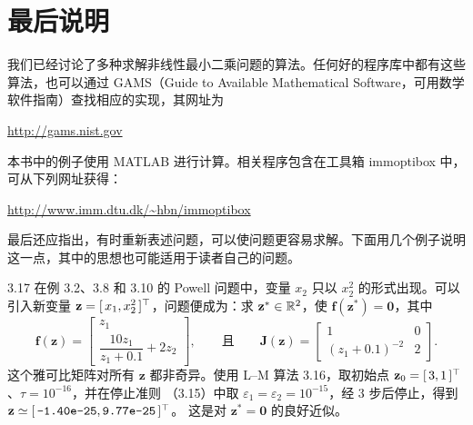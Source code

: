 \section{最后说明}\label{sec:final-remarks}
我们已经讨论了多种求解非线性最小二乘问题的算法。任何好的程序库中都有这些算法，也可以通过 GAMS（Guide to Available Mathematical Software，可用数学软件指南）查找相应的实现，其网址为
\begin{center}
  \url{http://gams.nist.gov}
\end{center}
本书中的例子使用 MATLAB 进行计算。相关程序包含在工具箱 immoptibox 中，可从下列网址获得：
\begin{center}
  \url{http://www.imm.dtu.dk/~hbn/immoptibox}
\end{center}
最后还应指出，有时重新表述问题，可以使问题更容易求解。下面用几个例子说明这一点，其中的思想也可能适用于读者自己的问题。

\begin{example}{3.17}
在例 3.2、3.8 和 3.10 的 Powell 问题中，变量 $x_2$ 只以 $x_2^2$ 的形式出现。可以引入新变量 $\mathbf z=[\,x_1,x_2^2\,]^{\top}$，问题便成为：求 $\mathbf z^*\in\mathbb{R}^2$，使 $\mathbf f(\mathbf z^*)=\mathbf0$，其中
\[
  \mathbf f(\mathbf z)=
    \begin{bmatrix}z_1\\\dfrac{10z_1}{z_1+0.1}+2z_2\end{bmatrix},
  \qquad\text{且}\qquad
  \mathbf J(\mathbf z)=
    \begin{bmatrix}1&0\\(z_1+0.1)^{-2}&2\end{bmatrix}.
\]
这个雅可比矩阵对所有 $\mathbf z$ 都非奇异。使用 L--M 算法 3.16，取初始点 $\mathbf z_0=[\,3,1\,]^{\top}$、$\tau=10^{-16}$，并在停止准则
（3.15）中取 $\varepsilon_1=\varepsilon_2=10^{-15}$，经 3 步后停止，得到
\mbox{$\mathbf z\simeq[\,\text{\ttfamily -1.40e-25},\text{\ttfamily 9.77e-25}\,]^{\top}$}。
这是对 $\mathbf z^*=\mathbf0$ 的良好近似。
\end{example}

